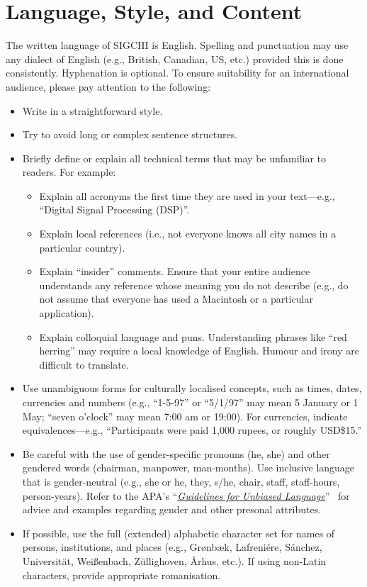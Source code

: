 \documentclass[preprint]{../latex/sigchi-modern}
\begin{document}
\section{Language, Style, and Content}
The written language of SIGCHI is English. Spelling and punctuation may use any
dialect of English (e.g., British, Canadian, US, etc.) provided this is done
consistently. Hyphenation is optional. To ensure suitability for an
international audience, please pay attention to the following:

\begin{itemize}
\item Write in a straightforward style.
\item Try to avoid long or complex sentence structures.
\item Briefly define or explain all technical terms that may be unfamiliar to
  readers. For example:
  \begin{itemize}
    \item Explain all acronyms the first time they are used in your text---e.g.,
      ``Digital Signal Processing (DSP)''.
    \item Explain local references (i.e., not everyone knows all city names in a
      particular country).
    \item Explain ``insider'' comments. Ensure that your entire audience
      understands any reference whose meaning you do not describe (e.g., do not
      assume that everyone has used a Macintosh or a particular application).
    \item Explain colloquial language and puns. Understanding phrases like ``red
      herring'' may require a local knowledge of English. Humour and irony are
      difficult to translate.
  \end{itemize}
\item Use unambiguous forms for culturally localised concepts, such as times,
  dates, currencies and numbers (e.g., ``1-5-97'' or ``5/1/97'' may mean 5
  January or 1 May; ``seven o'clock'' may mean 7:00 am or 19:00). For
  currencies, indicate equivalences---e.g., ``Participants were paid 1,000
  rupees, or roughly USD\$15.''
\item Be careful with the use of gender-specific pronouns (he, she) and other
  gendered words (chairman, manpower, man-months). Use inclusive language that
  is gender-neutral (e.g., she or he, they, s/he, chair, staff, staff-hours,
  person-years). Refer to the APA's
  ``\href{http://supp.apa.org/style/pubman-ch03.00.pdf}{\it Guidelines for 
  Unbiased Language}''~\cite{apa} for advice and examples regarding  gender and
  other presonal attributes.
\item If possible, use the full (extended) alphabetic character set for names of
  persons, institutions, and places (e.g., Gr{\o}nb{\ae}k, Lafreni\'ere,
  S\'anchez, Universit{\"a}t, Wei{\ss}enbach, Z{\"u}llighoven, \r{A}rhus, etc.).
  If using non-Latin characters, provide appropriate romanisation.
\end{itemize}
\end{document}

